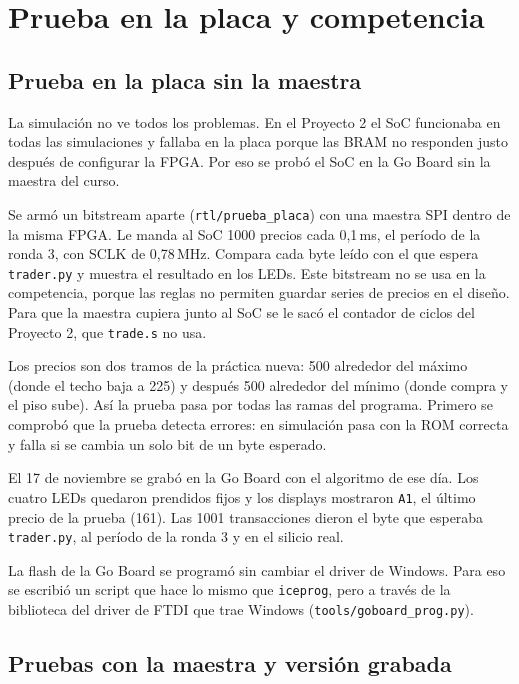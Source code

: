 \documentclass[11pt,letterpaper]{article}
\begin{document}
\section{Prueba en la placa y competencia}

\subsection{Prueba en la placa sin la maestra}

La simulación no ve todos los problemas. En el Proyecto 2 el SoC funcionaba en todas las simulaciones
y fallaba en la placa porque las BRAM no responden justo después de configurar la FPGA. Por eso se
probó el SoC en la Go Board sin la maestra del curso.

Se armó un bitstream aparte (\texttt{rtl/prueba\_placa}) con una maestra SPI dentro de la misma FPGA.
Le manda al SoC 1000 precios cada 0,1\,ms, el período de la ronda 3, con SCLK de 0,78\,MHz. Compara cada
byte leído con el que espera \texttt{trader.py} y muestra el resultado en los LEDs. Este bitstream no
se usa en la competencia, porque las reglas no permiten guardar series de precios en el diseño. Para
que la maestra cupiera junto al SoC se le sacó el contador de ciclos del Proyecto 2, que
\texttt{trade.s} no usa.

Los precios son dos tramos de la práctica nueva: 500 alrededor del máximo (donde el techo baja a 225) y
después 500 alrededor del mínimo (donde compra y el piso sube). Así la prueba pasa por todas las
ramas del programa. Primero se comprobó que la prueba detecta errores: en simulación pasa con la ROM
correcta y falla si se cambia un solo bit de un byte esperado.

El 17 de noviembre se grabó en la Go Board con el algoritmo de ese día. Los cuatro LEDs quedaron prendidos
fijos y los displays mostraron \texttt{A1}, el último precio de la prueba (161). Las 1001
transacciones dieron el byte que esperaba \texttt{trader.py}, al período de la ronda 3 y en el silicio
real.

La flash de la Go Board se programó sin cambiar el driver de Windows. Para eso se escribió un script
que hace lo mismo que \texttt{iceprog}, pero a través de la biblioteca del driver de FTDI que trae
Windows (\texttt{tools/goboard\_prog.py}).

\subsection{Pruebas con la maestra y versión grabada}
\end{document}
